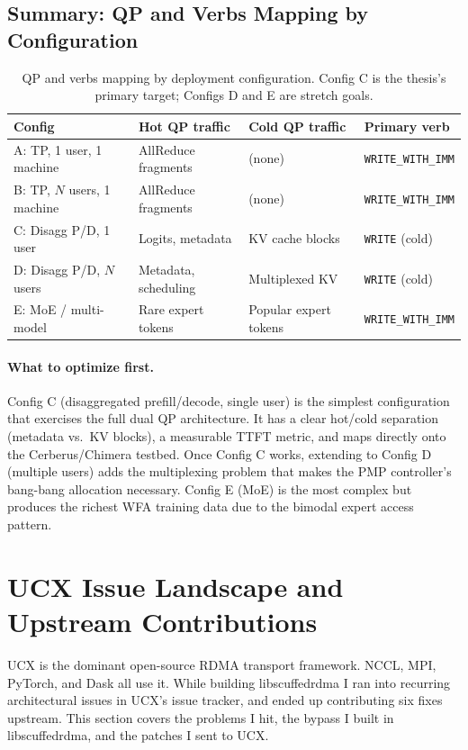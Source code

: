 \documentclass[11pt]{article}
\begin{document}
\subsection{Summary: QP and Verbs Mapping by Configuration}

\begin{table}[ht]
\centering\small
\begin{tabular}{llll}
\toprule
\textbf{Config} & \textbf{Hot QP traffic} & \textbf{Cold QP traffic} & \textbf{Primary verb} \\
\midrule
A: TP, 1 user, 1 machine & AllReduce fragments & (none) & \texttt{WRITE\_WITH\_IMM} \\
B: TP, $N$ users, 1 machine & AllReduce fragments & (none) & \texttt{WRITE\_WITH\_IMM} \\
C: Disagg P/D, 1 user & Logits, metadata & KV cache blocks & \texttt{WRITE} (cold) \\
D: Disagg P/D, $N$ users & Metadata, scheduling & Multiplexed KV & \texttt{WRITE} (cold) \\
E: MoE / multi-model & Rare expert tokens & Popular expert tokens & \texttt{WRITE\_WITH\_IMM} \\
\bottomrule
\end{tabular}
\caption{QP and verbs mapping by deployment configuration. Config C is the thesis's primary target; Configs D and E are stretch goals.}
\label{tab:config_summary}
\end{table}

\paragraph{What to optimize first.}
Config C (disaggregated prefill/decode, single user) is the simplest configuration that exercises the full dual QP architecture. It has a clear hot/cold separation (metadata vs.\ KV blocks), a measurable TTFT metric, and maps directly onto the Cerberus/Chimera testbed. Once Config C works, extending to Config D (multiple users) adds the multiplexing problem that makes the PMP controller's bang-bang allocation necessary. Config E (MoE) is the most complex but produces the richest WFA training data due to the bimodal expert access pattern.

\section{UCX Issue Landscape and Upstream Contributions}

UCX is the dominant open-source RDMA transport framework. NCCL, MPI, PyTorch, and Dask all use it. While building libscuffedrdma I ran into recurring architectural issues in UCX's issue tracker, and ended up contributing six fixes upstream. This section covers the problems I hit, the bypass I built in libscuffedrdma, and the patches I sent to UCX.
\end{document}
